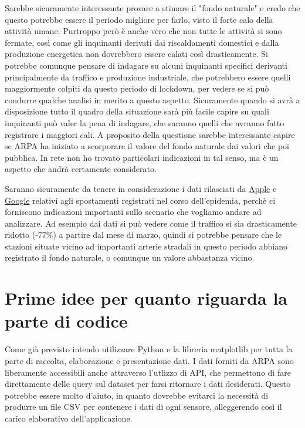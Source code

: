 \documentclass{article}
\begin{document}
Sarebbe sicuramente interessante provare a stimare il "fondo naturale" e credo che questo potrebbe essere il periodo migliore per farlo, visto il forte calo della attività umane. Purtroppo però è anche vero che non tutte le attività si sono fermate, così come gli inquinanti derivati dai riscaldamenti domestici e dalla produzione energetica non dovrebbero essere calati così drasticamente. Si potrebbe comunque pensare di indagare su alcuni inquinanti specifici derivanti principalmente da traffico e produzione industriale, che potrebbero essere quelli maggiormente colpiti da questo periodo di lockdown, per vedere se si può condurre qualche analisi in merito a questo aspetto. Sicuramente quando si avrà a disposizione tutto il quadro della situazione sarà più facile capire su quali inquinanti può valer la pena di indagare, che saranno quelli che avranno fatto registrare i maggiori cali.
A proposito della questione sarebbe interessante capire se ARPA ha iniziato a scorporare il valore del fondo naturale dai valori che poi pubblica. In rete non ho trovato particolari indicazioni in tal senso, ma è un aspetto che andrà certamente considerato.

Saranno sicuramente da tenere in considerazione i dati rilasciati da \href{https://www.apple.com/covid19/mobility}{Apple} e \href{https://www.google.com/covid19/mobility/}{Google} relativi agli spostamenti registrati nel corso dell'epidemia, perchè ci forniscono indicazioni importanti sullo scenario che vogliamo andare ad analizzare. Ad esempio dai dati si può vedere come il traffico si sia drasticamente ridotto (-77\%) a partire dal mese di marzo, quindi si potrebbe pensare che le stazioni situate vicino ad importanti arterie stradali in questo periodo abbiano registrato il fondo naturale, o comunque un valore abbastanza vicino.  


\section{Prime idee per quanto riguarda la parte di codice}
Come già previsto intendo utilizzare Python e la libreria matplotlib per tutta la parte di raccolta, elaborazione e presentazione dati. I dati forniti da ARPA sono liberamente accessibili anche attraverso l'utlizzo di API, che permettono di fare direttamente delle query sul dataset per farsi ritornare i dati desiderati. Questo potrebbe essere molto d'aiuto, in quanto dovrebbe evitarci la necessità di produrre un file CSV per contenere i dati di ogni sensore, alleggerendo così il carico elaborativo dell'applicazione.
\end{document}
